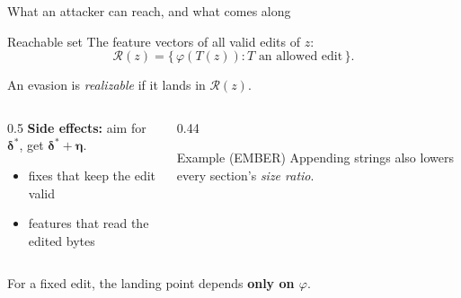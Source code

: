 \documentclass[aspectratio=169,11pt]{beamer}
\begin{document}
\begin{frame}{What an attacker can reach, and what comes along}
  \begin{block}{Reachable set}
    The feature vectors of all valid edits of $z$:
    \[
      \mathcal{R}(z) = \{\, \varphi(T(z)) : T \text{ an allowed edit} \,\}.
    \]
    \vspace{-1.2em}\par An evasion is \emph{realizable} if it lands in $\mathcal{R}(z)$.
  \end{block}
  \vspace{0.6em}
  \begin{columns}[T]
    \begin{column}{0.5\textwidth}
      \textbf{Side effects:} aim for $\boldsymbol{\delta}^*$, get $\boldsymbol{\delta}^* + \boldsymbol{\eta}$.
      \begin{itemize}
        \item fixes that keep the edit valid
        \item features that read the edited bytes
      \end{itemize}
    \end{column}
    \begin{column}{0.44\textwidth}
      \begin{exampleblock}{Example (EMBER)}
        Appending strings also lowers every section's \emph{size ratio}.
      \end{exampleblock}
    \end{column}
  \end{columns}
  \vfill
  \begin{center}
    For a fixed edit, the landing point depends \textbf{only on $\varphi$}.
  \end{center}
\end{frame}
\end{document}

